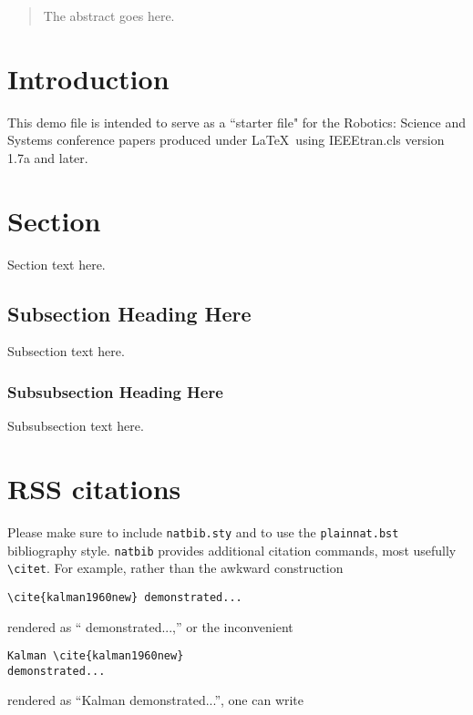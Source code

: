 \documentclass[conference]{IEEEtran}
\begin{document}
\begin{abstract}
The abstract goes here.
\end{abstract}

\IEEEpeerreviewmaketitle

\section{Introduction}
This demo file is intended to serve as a ``starter file" for the
Robotics: Science and Systems conference papers produced under \LaTeX\
using IEEEtran.cls version 1.7a and later.  

\section{Section}

Section text here. 

\subsection{Subsection Heading Here}
Subsection text here.

\subsubsection{Subsubsection Heading Here}
Subsubsection text here.


\section{RSS citations}

Please make sure to include \verb!natbib.sty! and to use the
\verb!plainnat.bst! bibliography style. \verb!natbib! provides additional
citation commands, most usefully \verb!\citet!. For example, rather than the
awkward construction 

{\small
\begin{verbatim}
\cite{kalman1960new} demonstrated...
\end{verbatim}
}

\noindent
rendered as ``\cite{kalman1960new} demonstrated...,''
or the
inconvenient 

{\small
\begin{verbatim}
Kalman \cite{kalman1960new} 
demonstrated...
\end{verbatim}
}

\noindent
rendered as 
``Kalman \cite{kalman1960new} demonstrated...'', 
one can
write 
\end{document}
